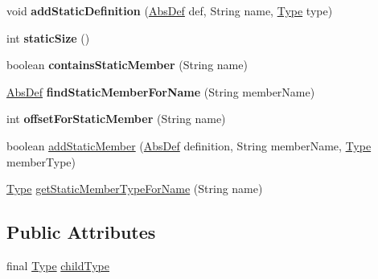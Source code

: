\begin{DoxyCompactItemize}
\mbox{\label{classcompiler_1_1seman_1_1type_1_1_can_type_a2629bd111b27cdebfcdcd9f3f9a0e119}} 
void {\bfseries add\+Static\+Definition} (\hyperlink{classcompiler_1_1abstr_1_1tree_1_1def_1_1_abs_def}{Abs\+Def} def, String name, \hyperlink{classcompiler_1_1seman_1_1type_1_1_type}{Type} type)
\item 
\mbox{\label{classcompiler_1_1seman_1_1type_1_1_can_type_aac5fef2cdf84b66983ff9e2dc2403c08}} 
int {\bfseries static\+Size} ()
\item 
\mbox{\label{classcompiler_1_1seman_1_1type_1_1_can_type_acccab0ae94c5d748df6bf282ff0788df}} 
boolean {\bfseries contains\+Static\+Member} (String name)
\item 
\mbox{\label{classcompiler_1_1seman_1_1type_1_1_can_type_a7c94b9837aa20bf830b9d0eb294f8ebd}} 
\hyperlink{classcompiler_1_1abstr_1_1tree_1_1def_1_1_abs_def}{Abs\+Def} {\bfseries find\+Static\+Member\+For\+Name} (String member\+Name)
\item 
\mbox{\label{classcompiler_1_1seman_1_1type_1_1_can_type_aa4e20310f86823b216c53af59fda76d6}} 
int {\bfseries offset\+For\+Static\+Member} (String name)
\item 
boolean \hyperlink{classcompiler_1_1seman_1_1type_1_1_can_type_a6646fa82011755612c126f77badf7d3e}{add\+Static\+Member} (\hyperlink{classcompiler_1_1abstr_1_1tree_1_1def_1_1_abs_def}{Abs\+Def} definition, String member\+Name, \hyperlink{classcompiler_1_1seman_1_1type_1_1_type}{Type} member\+Type)
\item 
\hyperlink{classcompiler_1_1seman_1_1type_1_1_type}{Type} \hyperlink{classcompiler_1_1seman_1_1type_1_1_can_type_a8b8377f254417fb9d79fef33e35f96d6}{get\+Static\+Member\+Type\+For\+Name} (String name)
\end{DoxyCompactItemize}
\subsection*{Public Attributes}
\begin{DoxyCompactItemize}
\item 
final \hyperlink{classcompiler_1_1seman_1_1type_1_1_type}{Type} \hyperlink{classcompiler_1_1seman_1_1type_1_1_can_type_a1db6e3a806fd5de1c78458f80d921aee}{child\+Type}
\end{DoxyCompactItemize}
